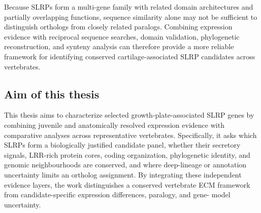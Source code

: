 Because SLRPs form a multi-gene family with related domain architectures and partially overlapping functions, sequence similarity alone may not be sufficient to distinguish orthologs from closely related paralogs. Combining expression evidence with reciprocal sequence searches, domain validation, phylogenetic reconstruction, and synteny analysis can therefore provide a more reliable framework for identifying conserved cartilage-associated SLRP candidates across vertebrates.

\subsection{Aim of this thesis}
\label{subsec:aim}

This thesis aims to characterize selected growth-plate-associated SLRP genes by
combining juvenile and anatomically resolved expression evidence with
comparative analyses across representative vertebrates. Specifically, it asks
which SLRPs form a biologically justified candidate panel, whether their
secretory signals, LRR-rich protein cores, coding organization, phylogenetic
identity, and genomic neighbourhoods are conserved, and where deep-lineage or
annotation uncertainty limits an ortholog assignment. By integrating these
independent evidence layers, the work distinguishes a conserved vertebrate ECM
framework from candidate-specific expression differences, paralogy, and gene-
model uncertainty.
